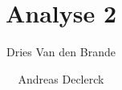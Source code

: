 \usepackage[dutch]{babel}
\usepackage{amsmath}

\title{Analyse 2}
\author{Dries Van den Brande \and Andreas Declerck}